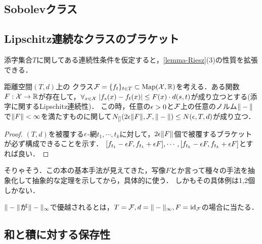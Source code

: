 \documentclass[uplatex,dvipdfmx]{jsreport}
\begin{document}
\subsection{Sobolevクラス}

\begin{lemma}\label{lemma-bracket-number-for-uniform-norm}
    
\end{lemma}

\subsection{Lipschitz連続なクラスのブラケット}

\begin{tcolorbox}[colframe=ForestGreen, colback=ForestGreen!10!white,breakable,colbacktitle=ForestGreen!40!white,coltitle=black,fonttitle=\bfseries\sffamily,
title=]
    添字集合$T$に関してある連続性条件を仮定すると，\ref{lemma-Riesz}(3)の性質を拡張できる．
\end{tcolorbox}

\begin{theorem}\label{thm-bracket-number-for-Lischitz-class}
    距離空間$(T,d)$上の
    クラス$\mathcal{F}=\{f_t\}_{t\in T}\subset\mathrm{Map}(\mathcal{X},\mathbb{R})$を考える．ある関数$F:\mathcal{X}\to\mathbb{R}$が存在して，$\forall_{x\in\mathcal{X}}\;\lvert f_s(x)-f_t(x)\rvert\le F(x)\cdot d(s,t)$が成り立つとする(添字に関するLipschitz連続性)．
    この時，任意の$\epsilon>0$と$\mathcal{F}$上の任意のノルム$\|-\|$で$\|F\|<\infty$を満たすものに関して$N_{[]}(2\epsilon\|F\|,\mathcal{F},\|-\|)\le N(\epsilon,T,d)$が成り立つ．
\end{theorem}
\begin{proof}
    $(T,d)$を被覆する$\epsilon$-網$t_1,\cdots,t_k$に対して，$2\epsilon\|F\|$個で被覆するブラケットが必ず構成できることを示す．
    $[f_{t_1}-\epsilon F,f_{t_1}+\epsilon F],\cdots,[f_{t_k}-\epsilon F,f_{t_k}+\epsilon F]$とすれば良い．
\end{proof}
\begin{remarks}
    そりゃそう．この本の基本手法が見えてきた，写像$F$とか言って種々の手法を抽象化して抽象的な定理を示してから，具体的に使う．
    しかもその具体例は1,2個しかない．
\end{remarks}
\begin{remark}
    $\|-\|$が$\|-\|_\infty$で優越されるとは，$T=\mathcal{F},d=\|-\|_\infty,F=\mathrm{id}_{\mathcal{F}}$の場合に当たる．
\end{remark}

\subsection{和と積に対する保存性}
\end{document}
